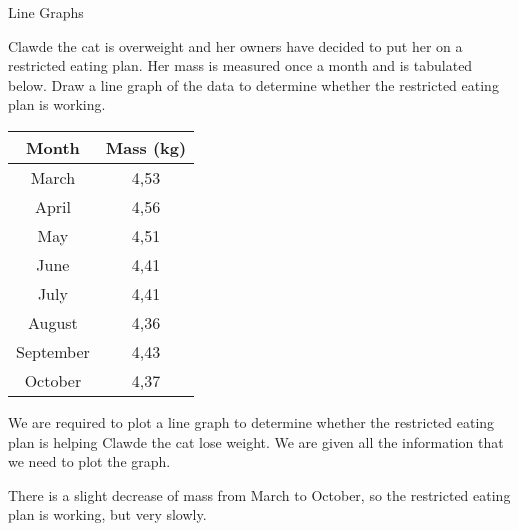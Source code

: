 \documentclass[10pt,a4paper,titlepage,twoside,openright]{report}
\begin{document}
\begin{wex}
{Line Graphs}
{Clawde the cat is overweight and her owners have decided to put her on a restricted eating plan. Her mass is measured once a month and is tabulated below. Draw a line graph of the data to determine whether the restricted eating plan is working.

\begin{center}
\begin{tabular}{|c|c|}\hline\hline
\textbf{Month} & \textbf{Mass} (kg)\\\hline\hline
March & 4,53\\\hline
April & 4,56\\\hline
May & 4,51\\\hline
June & 4,41\\\hline
July & 4,41\\\hline
August & 4,36\\\hline
September & 4,43\\\hline
October & 4,37\\\hline
\hline
\end{tabular}
\end{center}}
{
We are required to plot a line graph to determine whether the restricted eating plan is helping Clawde the cat lose weight. We are given all the information that we need to plot the graph.

\begin{center}
\end{center}

There is a slight decrease of mass from March to October, so the restricted eating plan is working, but very slowly.}
\end{wex}
\end{document}
